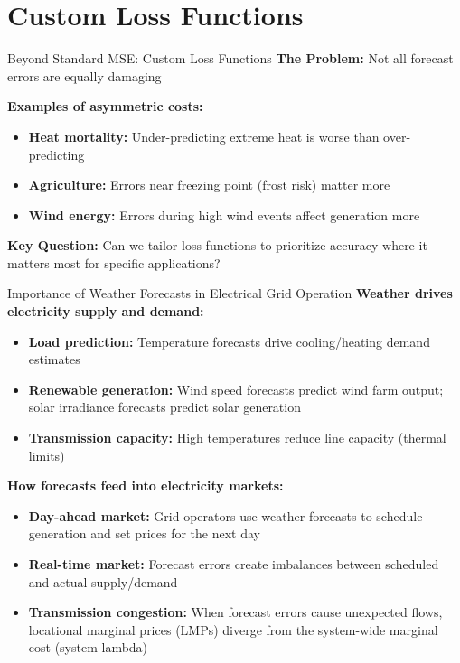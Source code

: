 \documentclass[aspectratio=169, xcolor=dvipsnames]{beamer}
\begin{document}
\section{Custom Loss Functions}

\begin{frame}{Beyond Standard MSE: Custom Loss Functions}
    \textbf{The Problem:} Not all forecast errors are equally damaging  

    \vspace{0.3cm}
    \textbf{Examples of asymmetric costs:}
    \begin{itemize}
        \item \textbf{Heat mortality:} Under-predicting extreme heat is worse than over-predicting
        \item \textbf{Agriculture:} Errors near freezing point (frost risk) matter more
        \item \textbf{Wind energy:} Errors during high wind events affect generation more
    \end{itemize}

    \vspace{0.3cm}
    \textbf{Key Question:} Can we tailor loss functions to prioritize accuracy where it matters most for specific applications?

\end{frame}

\begin{frame}{Importance of Weather Forecasts in Electrical Grid Operation}
    \textbf{Weather drives electricity supply and demand:}
    \begin{itemize}
        \item \textbf{Load prediction:} Temperature forecasts drive cooling/heating demand estimates
        \item \textbf{Renewable generation:} Wind speed forecasts predict wind farm output; solar irradiance forecasts predict solar generation
        \item \textbf{Transmission capacity:} High temperatures reduce line capacity (thermal limits)
    \end{itemize}

    \vspace{0.3cm}
    \textbf{How forecasts feed into electricity markets:}
    \begin{itemize}
        \item \textbf{Day-ahead market:} Grid operators use weather forecasts to schedule generation and set prices for the next day
        \item \textbf{Real-time market:} Forecast errors create imbalances between scheduled and actual supply/demand
        \item \textbf{Transmission congestion:} When forecast errors cause unexpected flows, locational marginal prices (LMPs) diverge from the system-wide marginal cost (system lambda)
    \end{itemize}

\end{frame}
\end{document}
